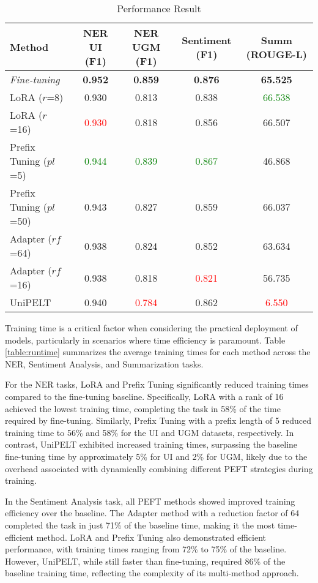 \begin{table*}[!ht]
    \centering
    \caption{Performance Result}
    \label{table:performance}
    \begin{tabular}{l|c|c|c|c}
        \toprule
        \textbf{Method} & \textbf{NER UI (F1)} & \textbf{NER UGM (F1)} & \textbf{Sentiment (F1)} & \textbf{Summ (ROUGE-L)} \\
        \midrule
        \textit{Fine-tuning} & \textbf{0.952} & \textbf{0.859} & \textbf{0.876} & \textbf{65.525} \\
        LoRA ($r$=8) & {0.930} & 0.813 & 0.838 & \textcolor{Green}{66.538} \\
        LoRA ($r$=16) & \textcolor{Red}{0.930} & 0.818 & 0.856 & 66.507 \\
        Prefix Tuning ($pl$=5) & \textcolor{Green}{0.944} & \textcolor{Green}{0.839} & \textcolor{Green}{0.867} & 46.868 \\
        Prefix Tuning ($pl$=50) & 0.943 & 0.827 & 0.859 & 66.037 \\
        Adapter ($rf$=64) & 0.938 & 0.824 & 0.852 & 63.634 \\
        Adapter ($rf$=16) & 0.938 & 0.818 & \textcolor{Red}{0.821} & 56.735 \\
        UniPELT & 0.940 & \textcolor{Red}{0.784} & 0.862 & \textcolor{Red}{6.550} \\
        \bottomrule
    \end{tabular}
\end{table*}

Training time is a critical factor when considering the practical deployment of models, particularly in scenarios where time efficiency is paramount. Table \ref{table:runtime} summarizes the average training times for each method across the NER, Sentiment Analysis, and Summarization tasks.

For the NER tasks, LoRA and Prefix Tuning significantly reduced training times compared to the fine-tuning baseline. Specifically, LoRA with a rank of 16 achieved the lowest training time, completing the task in 58\% of the time required by fine-tuning. Similarly, Prefix Tuning with a prefix length of 5 reduced training time to 56\% and 58\% for the UI and UGM datasets, respectively. In contrast, UniPELT exhibited increased training times, surpassing the baseline fine-tuning time by approximately 5\% for UI and 2\% for UGM, likely due to the overhead associated with dynamically combining different PEFT strategies during training.

In the Sentiment Analysis task, all PEFT methods showed improved training efficiency over the baseline. The Adapter method with a reduction factor of 64 completed the task in just 71\% of the baseline time, making it the most time-efficient method. LoRA and Prefix Tuning also demonstrated efficient performance, with training times ranging from 72\% to 75\% of the baseline. However, UniPELT, while still faster than fine-tuning, required 86\% of the baseline training time, reflecting the complexity of its multi-method approach.

